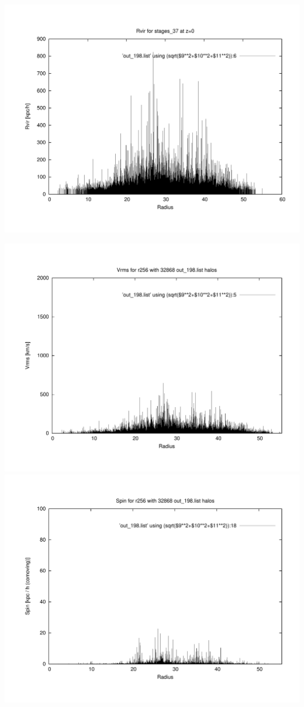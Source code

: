 \includegraphics[scale=0.3]{r256/stages_37/plot_rvir_z0.pdf}

\includegraphics[scale=0.3]{r256/stages_37/plot_Vrms_out_198.pdf}
\includegraphics[scale=0.3]{r256/stages_37/plot_spin_out_198.pdf}

